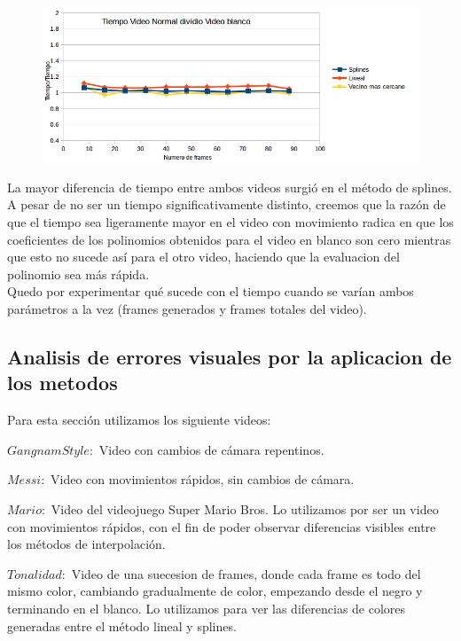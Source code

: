 \begin{figure}
  \vspace{-20pt}
  \begin{center}
    \includegraphics[scale= 0.6]{imagenes/aumentandoFramesMessiSobreWhite.png}
  \end{center}
  \vspace{-10pt}
  \vspace{-10pt}
\end{figure}

La mayor diferencia de tiempo entre ambos videos surgió en el método de splines. A pesar de no ser un tiempo significativamente distinto, creemos que la razón de que el tiempo sea ligeramente mayor en el video con movimiento radica en que los coeficientes de los polinomios obtenidos para el video en blanco son cero mientras que esto no sucede así para el otro video, haciendo que la evaluacion del polinomio sea más rápida.\\

Quedo por experimentar qué sucede con el tiempo cuando se varían ambos parámetros a la vez (frames generados y frames totales del video).



\subsection{Analisis de errores visuales por la aplicacion de los metodos}
\noindent Para esta sección utilizamos los siguiente videos:

$Gangnam Style:$ Video con cambios de cámara repentinos.

$Messi:$ Video con movimientos rápidos, sin cambios de cámara.

$Mario:$ Video del videojuego Super Mario Bros. Lo utilizamos por ser un video con movimientos rápidos, con el fin de poder observar diferencias visibles entre los métodos de 
interpolación.

$Tonalidad:$ Video de una suecesion de frames, donde cada frame es todo del mismo color, cambiando gradualmente de color, empezando desde el negro y terminando en el blanco. Lo utilizamos para ver las diferencias de colores generadas entre el método lineal y splines.\\

